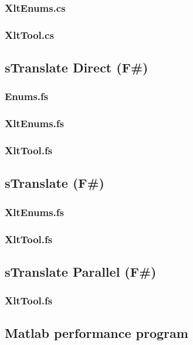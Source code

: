 \documentclass[12pt, a4paper]{article}
\begin{document}
\subsubsection{XltEnums.cs}

\newpage
\subsubsection{XltTool.cs}


\newpage
\subsection{sTranslate Direct (F\#)}
\subsubsection{Enums.fs}

\newpage
\subsubsection{XltEnums.fs}

\newpage
\subsubsection{XltTool.fs}


\newpage
\subsection{sTranslate (F\#)}
\subsubsection{XltEnums.fs}

\newpage
\subsubsection{XltTool.fs}


\newpage
\subsection{sTranslate Parallel (F\#)}
\subsubsection{XltTool.fs}


\newpage
\subsection{Matlab performance program}

\end{document}
